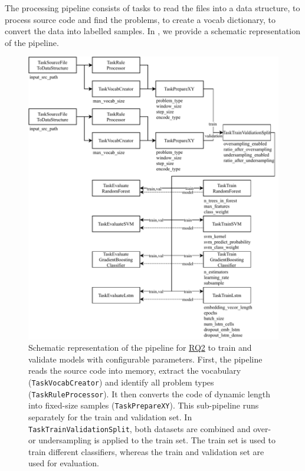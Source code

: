 The processing pipeline consists of tasks to read the files into a data structure, to process source code and find the problems, to create a vocab dictionary, to convert the data into labelled samples. In , we provide a schematic representation of the pipeline.

\begin{figure}
    \includegraphics[width=1\textwidth]{img/ML/Pipeline_RQ2.pdf}
    \caption{Schematic representation of the pipeline for \hyperref[rq:2]{RQ2} to train and validate models with configurable parameters. First, the pipeline reads the source code into memory, extract the vocabulary (\texttt{TaskVocabCreator}) and identify all problem types (\texttt{TaskRuleProcessor}). It then converts the code of dynamic length into fixed-size samples (\texttt{TaskPrepareXY}). This sub-pipeline runs separately for the train and validation set. In \texttt{TaskTrainValidationSplit}, both datasets are combined and over- or undersampling is applied to the train set. The train set is used to train different classifiers, whereas the train and validation set are used for evaluation.}
    \label{fig:pipeline_rq2}
\end{figure}


